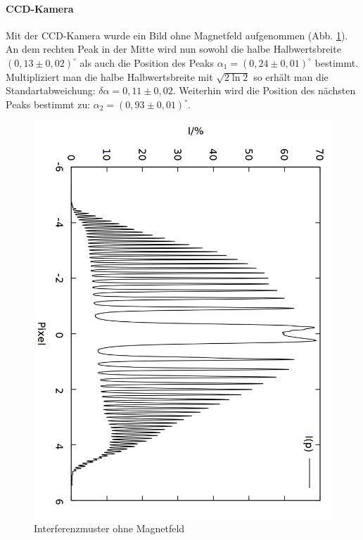 \paragraph{CCD-Kamera}
Mit der CCD-Kamera wurde ein Bild ohne Magnetfeld aufgenommen (Abb. \ref{fig:ohneb}).\\
An dem rechten Peak in der Mitte wird nun sowohl die halbe Halbwertsbreite $(0,13 \pm 0,02)^\circ$  als auch die Position des Peaks $\alpha_{1} = (0,24\pm 0,01)^\circ$ bestimmt. Multipliziert man die halbe Halbwertsbreite mit $\sqrt{2\ln 2}$ so erhält man die Standartabweichung: $\delta \alpha = 0,11 \pm 0,02$. Weiterhin wird die Position des nächsten Peaks bestimmt zu: $\alpha_2 = (0,93\pm 0,01)^\circ$.\\
\begin{figure}
\centering
\includegraphics[scale=0.5]{data/zeeman/out_0_0_raw.png}
\caption{Interferenzmuster ohne Magnetfeld}
\label{fig:ohneb}
\end{figure}

